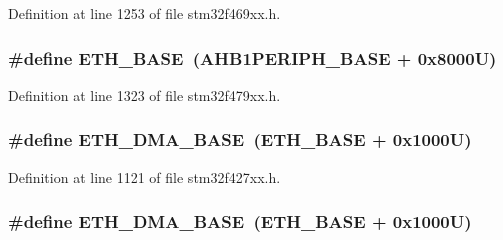 Definition at line 1253 of file stm32f469xx.\+h.

\subsubsection[{\texorpdfstring{E\+T\+H\+\_\+\+B\+A\+SE}{ETH_BASE}}]{\setlength{\rightskip}{0pt plus 5cm}\#define E\+T\+H\+\_\+\+B\+A\+SE~({\bf A\+H\+B1\+P\+E\+R\+I\+P\+H\+\_\+\+B\+A\+SE} + 0x8000\+U)}\hypertarget{group___peripheral__memory__map_gad965a7b1106ece575ed3da10c45c65cc}{}\label{group___peripheral__memory__map_gad965a7b1106ece575ed3da10c45c65cc}


Definition at line 1323 of file stm32f479xx.\+h.

\subsubsection[{\texorpdfstring{E\+T\+H\+\_\+\+D\+M\+A\+\_\+\+B\+A\+SE}{ETH_DMA_BASE}}]{\setlength{\rightskip}{0pt plus 5cm}\#define E\+T\+H\+\_\+\+D\+M\+A\+\_\+\+B\+A\+SE~({\bf E\+T\+H\+\_\+\+B\+A\+SE} + 0x1000\+U)}\hypertarget{group___peripheral__memory__map_gace2114e1b37c1ba88d60f3e831b67e93}{}\label{group___peripheral__memory__map_gace2114e1b37c1ba88d60f3e831b67e93}


Definition at line 1121 of file stm32f427xx.\+h.

\subsubsection[{\texorpdfstring{E\+T\+H\+\_\+\+D\+M\+A\+\_\+\+B\+A\+SE}{ETH_DMA_BASE}}]{\setlength{\rightskip}{0pt plus 5cm}\#define E\+T\+H\+\_\+\+D\+M\+A\+\_\+\+B\+A\+SE~({\bf E\+T\+H\+\_\+\+B\+A\+SE} + 0x1000\+U)}\hypertarget{group___peripheral__memory__map_gace2114e1b37c1ba88d60f3e831b67e93}{}\label{group___peripheral__memory__map_gace2114e1b37c1ba88d60f3e831b67e93}


